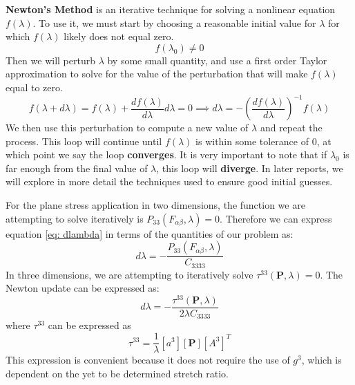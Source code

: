 \documentclass[]{spie}  %
\begin{document}
\textbf{Newton's Method} is an iterative technique for solving a nonlinear equation $f(\lambda)$. To use it, we must start by choosing a reasonable initial value for $\lambda$ for which $f(\lambda)$ likely does not equal zero. 
\begin{equation}
f(\lambda_0) \neq 0
\end{equation}
Then we will perturb $\lambda$ by some small quantity, and use a first order Taylor approximation to solve for the value of the perturbation that will make $f(\lambda)$ equal to zero.
\begin{equation}
\label{eq: dlambda}
f(\lambda + d\lambda) = f(\lambda) + \frac{df(\lambda)}{d\lambda}d\lambda = 0 \implies d\lambda = -\left(\frac{df(\lambda)}{d\lambda}\right)^{-1} f(\lambda)
\end{equation}
We then use this perturbation to compute a new value of $\lambda$ and repeat the process. This loop will continue until $f(\lambda)$ is within some tolerance of 0, at which point we say the loop \textbf{converges}. It is very important to note that if $\lambda_0$ is far enough from the final value of $\lambda$, this loop will \textbf{diverge}. In later reports, we will explore in more detail the techniques used to ensure good initial guesses. 

For the plane stress application in two dimensions, the function we are attempting to solve iteratively is $P_{33}(F_{\alpha\beta}, \lambda) = 0$. Therefore we can express equation \ref{eq: dlambda} in terms of the quantities of our problem as:
\begin{equation}
\label{eq: dlambda P}
d\lambda = - \frac{P_{33}(F_{\alpha\beta}, \lambda)}{C_{3333}}
\end{equation}
In three dimensions, we are attempting to iteratively solve $\tau^{33}(\bm{P}, \lambda) = 0$. The Newton update can be expressed as:
\begin{equation}
\label{eq: dlambda T}
d\lambda = - \frac{\tau^{33}(\bm{P}, \lambda)}{2 \lambda C_{3333}}
\end{equation}
where $\tau^{33}$ can be expressed as
\begin{equation}
\tau^{33} = \frac{1}{\lambda} \left[a^3\right]\left[\bm{P}\right]\left[A^3\right]^T
\end{equation}
This expression is convenient because it does not require the use of $g^3$, which is dependent on the yet to be determined stretch ratio.
\end{document}

